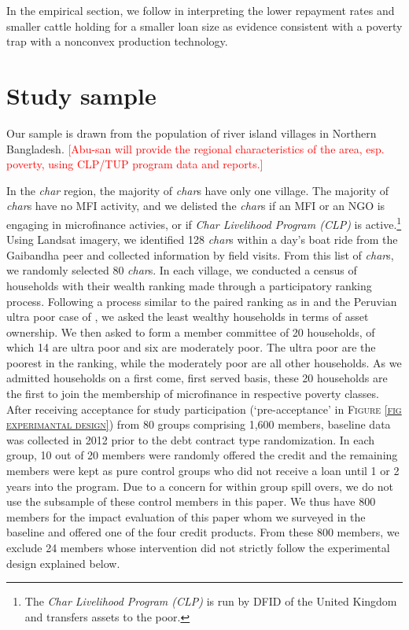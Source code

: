 	In the empirical section, we follow \citet{BandieraBRAC2017} in interpreting the lower repayment rates and smaller cattle holding for a smaller loan size as evidence consistent with a poverty trap with a nonconvex production technology. 

\section{Study sample}
\label{SecStudySample}

	Our sample is drawn from the population of river island villages in Northern Bangladesh. 
	\textcolor{red}{[Abu-san will provide the regional characteristics of the area, esp. poverty, using CLP/TUP program data and reports.]}
	
	In the \textit{char} region, the majority of \textit{char}s have only one village. The majority of \textit{char}s have no MFI activity, and we delisted the \textit{char}s if an MFI or an NGO is engaging in microfinance activies, or if \textit{Char Livelihood Program (CLP)} is active.\footnote{The \textit{Char Livelihood Program (CLP)} is run by DFID of the United Kingdom and transfers assets to the poor. } Using Landsat imagery, we identified 128 \textit{char}s within a day's boat ride from the Gaibandha peer and collected information by field visits. From this list of \textit{char}s, we randomly selected 80 \textit{char}s. In each village, we conducted a census of households with their wealth ranking made through a participatory ranking process. Following a process similar to the paired ranking as in \citet[][p.1212]{Alatas2012} and the Peruvian ultra poor case of \citet[][p.66]{KarlanThuysbaert2019}, we asked the least wealthy households in terms of asset ownership. We then asked to form a member committee of 20 households, of which 14 are ultra poor and six are moderately poor. The ultra poor are the poorest in the ranking, while the moderately poor are all other households. As we admitted households on a first come, first served basis, these 20 households are the first to join the membership of microfinance in respective poverty classes. After receiving acceptance for study participation (`pre-acceptance' in \textsc{\normalsize Figure \ref{fig experimantal design}}) from 80 groups comprising 1,600 members, baseline data was collected in 2012 prior to the debt contract type randomization. In each group, 10 out of 20 members were randomly offered the credit and the remaining members were kept as pure control groups who did not receive a loan until 1 or 2 years into the program. Due to a concern for within group spill overs, we do not use the subsample of these control members in this paper. We thus have 800 members for the impact evaluation of this paper whom we surveyed in the baseline and offered one of the four credit products. From these 800 members, we exclude 24 members whose intervention did not strictly follow the experimental design explained below.

